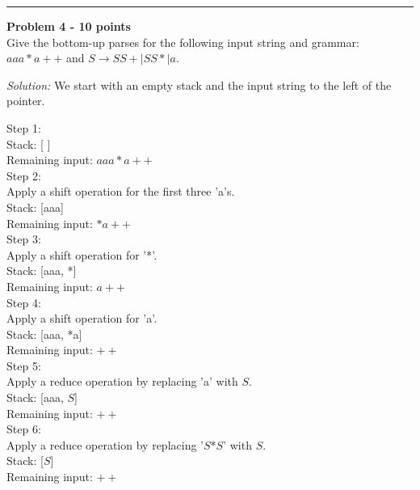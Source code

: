 \documentclass[a4paper, 11pt]{article}
\newenvironment{problem}[2][Problem]
    { \begin{mdframed}[backgroundcolor=gray!20] \textbf{#1 #2} \\}
    {  \end{mdframed}}
\newenvironment{solution}
    {\textit{Solution:}}
    {}
\begin{document}
\noindent\rule{7in}{2.8pt}

\begin{problem}{4 - 10 points}
Give the bottom-up parses for the following input string and grammar: $aaa*a++$ and $S  \longrightarrow SS+ | SS* | a $. 

\end{problem}

\begin{solution}
We start with an empty stack and the input string to the left of the pointer.

\noindent Step 1:\\
\quad Stack: [ ]\\
\quad Remaining input: $aaa*a++$ \\

\noindent Step 2:\\
\quad Apply a shift operation for the first three 'a's.\\
\quad Stack: [aaa]\\
\quad Remaining input: $*a++$ \\

\noindent Step 3:\\
\quad Apply a shift operation for '*'.\\
\quad Stack: [aaa, *]\\
\quad Remaining input: $a++$ \\

\noindent Step 4:\\
\quad Apply a shift operation for 'a'.\\
\quad Stack: [aaa, *a]\\
\quad Remaining input: $++$ \\

\noindent Step 5:\\
\quad Apply a reduce operation by replacing 'a' with $S$.\\
\quad Stack: [aaa, $S$]\\
\quad Remaining input: $++$ \\

\noindent Step 6:\\
\quad Apply a reduce operation by replacing '$S$*$S$' with $S$.\\
\quad Stack: [$S$]\\
\quad Remaining input: $++$ \\ 


\end{solution}
\end{document}
